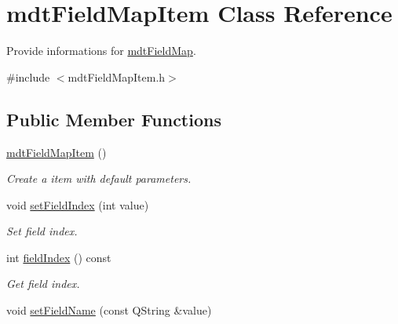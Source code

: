 \hypertarget{classmdt_field_map_item}{
\section{mdtFieldMapItem Class Reference}
\label{classmdt_field_map_item}
}


Provide informations for \hyperlink{classmdt_field_map}{mdtFieldMap}.  




{\ttfamily \#include $<$mdtFieldMapItem.h$>$}

\subsection*{Public Member Functions}
\begin{DoxyCompactItemize}
\item 
\hyperlink{classmdt_field_map_item_a36e1f695842b8ba275f535db80fc8033}{mdtFieldMapItem} ()
\begin{DoxyCompactList}\small\item\em Create a item with default parameters. \end{DoxyCompactList}\item 
\hypertarget{classmdt_field_map_item_a6a6d6aca3e86afc048f429f91c6e9fb2}{
void \hyperlink{classmdt_field_map_item_a6a6d6aca3e86afc048f429f91c6e9fb2}{setFieldIndex} (int value)}
\label{classmdt_field_map_item_a6a6d6aca3e86afc048f429f91c6e9fb2}

\begin{DoxyCompactList}\small\item\em Set field index. \end{DoxyCompactList}\item 
\hypertarget{classmdt_field_map_item_a9fbc43268f0fa7f0ade4a03cc73dbe05}{
int \hyperlink{classmdt_field_map_item_a9fbc43268f0fa7f0ade4a03cc73dbe05}{fieldIndex} () const }
\label{classmdt_field_map_item_a9fbc43268f0fa7f0ade4a03cc73dbe05}

\begin{DoxyCompactList}\small\item\em Get field index. \end{DoxyCompactList}\item 
\hypertarget{classmdt_field_map_item_a02c24ce624a4c53a794bf02f98815cf4}{
void \hyperlink{classmdt_field_map_item_a02c24ce624a4c53a794bf02f98815cf4}{setFieldName} (const QString \&value)}
\label{classmdt_field_map_item_a02c24ce624a4c53a794bf02f98815cf4}


\end{DoxyCompactItemize}
